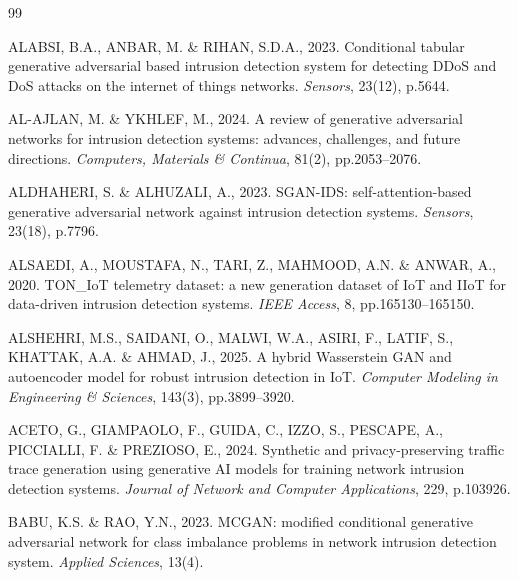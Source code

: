 \documentclass[10pt,twocolumn,a4paper]{extarticle}
\begin{document}
\renewcommand{\refname}{Daftar Pustaka}
\begin{thebibliography}{99}
\setlength{\itemsep}{2pt}

ALABSI, B.A., ANBAR, M. \& RIHAN, S.D.A., 2023. Conditional tabular generative adversarial based intrusion detection system for detecting DDoS and DoS attacks on the internet of things networks. \textit{Sensors}, 23(12), p.5644.

AL-AJLAN, M. \& YKHLEF, M., 2024. A review of generative adversarial networks for intrusion detection systems: advances, challenges, and future directions. \textit{Computers, Materials \& Continua}, 81(2), pp.2053--2076.

ALDHAHERI, S. \& ALHUZALI, A., 2023. SGAN-IDS: self-attention-based generative adversarial network against intrusion detection systems. \textit{Sensors}, 23(18), p.7796.

ALSAEDI, A., MOUSTAFA, N., TARI, Z., MAHMOOD, A.N. \& ANWAR, A., 2020. TON\_IoT telemetry dataset: a new generation dataset of IoT and IIoT for data-driven intrusion detection systems. \textit{IEEE Access}, 8, pp.165130--165150.

ALSHEHRI, M.S., SAIDANI, O., MALWI, W.A., ASIRI, F., LATIF, S., KHATTAK, A.A. \& AHMAD, J., 2025. A hybrid Wasserstein GAN and autoencoder model for robust intrusion detection in IoT. \textit{Computer Modeling in Engineering \& Sciences}, 143(3), pp.3899--3920.

ACETO, G., GIAMPAOLO, F., GUIDA, C., IZZO, S., PESCAPE, A., PICCIALLI, F. \& PREZIOSO, E., 2024. Synthetic and privacy-preserving traffic trace generation using generative AI models for training network intrusion detection systems. \textit{Journal of Network and Computer Applications}, 229, p.103926.

BABU, K.S. \& RAO, Y.N., 2023. MCGAN: modified conditional generative adversarial network for class imbalance problems in network intrusion detection system. \textit{Applied Sciences}, 13(4).


\end{thebibliography}
\end{document}
